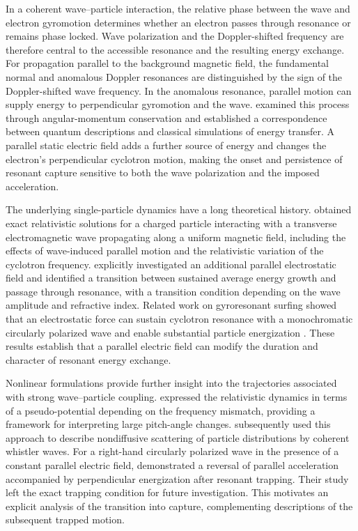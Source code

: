 \documentclass{jpp}
\begin{document}
In a coherent wave--particle interaction, the relative phase between the wave and electron gyromotion determines whether an electron passes through resonance or remains phase locked. Wave polarization and the Doppler-shifted frequency are therefore central to the accessible resonance and the resulting energy exchange. For propagation parallel to the background magnetic field, the fundamental normal and anomalous Doppler resonances are distinguished by the sign of the Doppler-shifted wave frequency. In the anomalous resonance, parallel motion can supply energy to perpendicular gyromotion and the wave. \citet{Xu2025} examined this process through angular-momentum conservation and established a correspondence between quantum descriptions and classical simulations of energy transfer. A parallel static electric field adds a further source of energy and changes the electron's perpendicular cyclotron motion, making the onset and persistence of resonant capture sensitive to both the wave polarization and the imposed acceleration.

The underlying single-particle dynamics have a long theoretical history. \citet{RobertsBuchsbaum1964} obtained exact relativistic solutions for a charged particle interacting with a transverse electromagnetic wave propagating along a uniform magnetic field, including the effects of wave-induced parallel motion and the relativistic variation of the cyclotron frequency. \citet{SchramBeukema1969} explicitly investigated an additional parallel electrostatic field and identified a transition between sustained average energy growth and passage through resonance, with a transition condition depending on the wave amplitude and refractive index. Related work on gyroresonant surfing showed that an electrostatic force can sustain cyclotron resonance with a monochromatic circularly polarized wave and enable substantial particle energization \citep{KuramitsuKrasnoselskikh2005}. These results establish that a parallel electric field can modify the duration and character of resonant energy exchange.

Nonlinear formulations provide further insight into the trajectories associated with strong wave--particle coupling. \citet{Bellan2013} expressed the relativistic dynamics in terms of a pseudo-potential depending on the frequency mismatch, providing a framework for interpreting large pitch-angle changes. \citet{YoonBellan2020} subsequently used this approach to describe nondiffusive scattering of particle distributions by coherent whistler waves. For a right-hand circularly polarized wave in the presence of a constant parallel electric field, \citet{Kang2026} demonstrated a reversal of parallel acceleration accompanied by perpendicular energization after resonant trapping. Their study left the exact trapping condition for future investigation. This motivates an explicit analysis of the transition into capture, complementing descriptions of the subsequent trapped motion.
\end{document}

